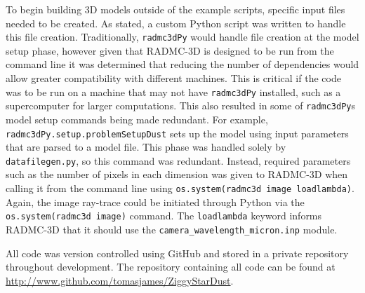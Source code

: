 \documentclass{report}
\begin{document}
To begin building 3D models outside of the example scripts, specific input files needed to be created. As stated, a custom Python script was written to handle this file creation. Traditionally, \texttt{radmc3dPy} would handle file creation at the model setup phase, however given that RADMC-3D is designed to be run from the command line it was determined that reducing the number of dependencies would allow greater compatibility with different machines. This is critical if the code was to be run on a machine that may not have \texttt{radmc3dPy} installed, such as a supercomputer for larger computations. This also resulted in some of \texttt{radmc3dPy\textquotesingle}s model setup commands being made redundant. For example, \texttt{radmc3dPy.setup.problemSetupDust} sets up the model using input parameters that are parsed to a model file. This phase was handled solely by \texttt{datafilegen.py}, so this command was redundant. Instead, required parameters such as the number of pixels in each dimension was given to RADMC-3D when calling it from the command line using \texttt{os.system(radmc3d image loadlambda)}. Again, the image ray-trace could be initiated through Python via the \texttt{os.system(radmc3d image)} command. The \texttt{loadlambda} keyword informs RADMC-3D that it should use the \texttt{camera\_wavelength\_micron.inp} module.

All code was version controlled using GitHub and stored in a private repository throughout development. The repository containing all code can be found at \href{http://www.github.com/tomasjames/ZiggyStarDust}{http://www.github.com/tomasjames/ZiggyStarDust}.


\printbibliography


\end{document}
